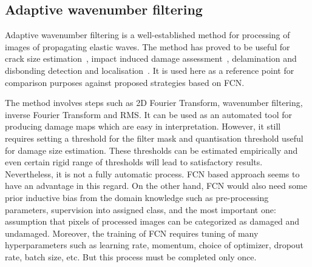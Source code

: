 
\subsection{Adaptive wavenumber filtering}
Adaptive wavenumber filtering is a well-established method for processing of images of propagating elastic waves.
The method has proved to be useful for crack size estimation~\cite{Kudela2015}, impact induced damage assessment~\cite{Kudela2018},  delamination and disbonding detection and localisation~\cite{Radzienski2019}.  
It is used here as a reference point for comparison purposes against proposed strategies based on FCN.

The method involves steps such as 2D Fourier Transform, wavenumber filtering, inverse Fourier Transform and RMS.
It can be used as an automated tool for producing damage maps which are easy in interpretation.
However, it still requires setting a threshold for the filter mask and quantisation threshold useful for damage size estimation.
These thresholds can be estimated empirically and even certain rigid range of thresholds will lead to satisfactory results.
Nevertheless, it is not a fully automatic process.
FCN based approach seems to have an advantage in this regard.
On the other hand, FCN would also need some prior inductive bias from the domain knowledge such as pre-processing parameters, supervision into assigned class, and the most important one: assumption that pixels of processed images can be categorized as damaged and undamaged.
Moreover, the training of FCN requires tuning of many hyperparameters such as  learning rate, momentum, choice of optimizer, dropout rate, batch size, etc. 
But this process must be completed only once.